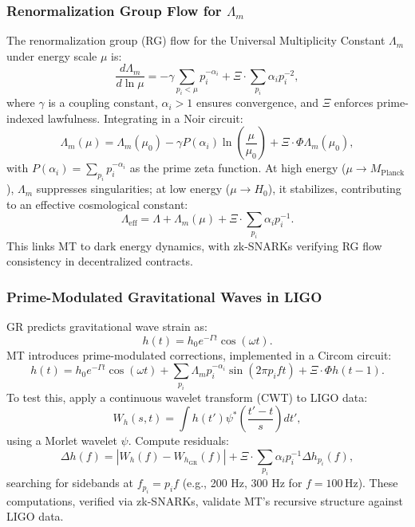 \documentclass{article}
\theoremstyle{plain}
\begin{document}
\subsubsection{Renormalization Group Flow for \(\Lambda_m\)}
The renormalization group (RG) flow for the Universal Multiplicity Constant \(\Lambda_m\) under energy scale \(\mu\) is:
\begin{equation}
\frac{d \Lambda_m}{d \ln \mu} = -\gamma \sum_{p_i < \mu} p_i^{-\alpha_i} + \Xi \cdot \sum_{p_i} \alpha_i p_i^{-2},
\end{equation}
where \(\gamma\) is a coupling constant, \(\alpha_i > 1\) ensures convergence, and \(\Xi\) enforces prime-indexed lawfulness. Integrating in a Noir circuit:
\begin{equation}
\Lambda_m(\mu) = \Lambda_m(\mu_0) - \gamma P(\alpha_i) \ln \left( \frac{\mu}{\mu_0} \right) + \Xi \cdot \Phi \Lambda_m(\mu_0),
\end{equation}
with \( P(\alpha_i) = \sum_{p_i} p_i^{-\alpha_i} \) as the prime zeta function. At high energy (\(\mu \to M_{\text{Planck}}\)), \(\Lambda_m\) suppresses singularities; at low energy (\(\mu \to H_0\)), it stabilizes, contributing to an effective cosmological constant:
\begin{equation}
\Lambda_{\text{eff}} = \Lambda + \Lambda_m(\mu) + \Xi \cdot \sum_{p_i} \alpha_i p_i^{-1}.
\end{equation}
This links MT to dark energy dynamics, with zk-SNARKs verifying RG flow consistency in decentralized contracts.

\subsubsection{Prime-Modulated Gravitational Waves in LIGO}
GR predicts gravitational wave strain as:
\begin{equation}
h(t) = h_0 e^{-\Gamma t} \cos(\omega t).
\end{equation}
MT introduces prime-modulated corrections, implemented in a Circom circuit:
\begin{equation}
h(t) = h_0 e^{-\Gamma t} \cos(\omega t) + \sum_{p_i} \Lambda_m p_i^{-\alpha_i} \sin(2 \pi p_i f t) + \Xi \cdot \Phi h(t-1).
\end{equation}
To test this, apply a continuous wavelet transform (CWT) to LIGO data:
\begin{equation}
W_h(s, t) = \int h(t') \psi^*\left( \frac{t' - t}{s} \right) dt',
\end{equation}
using a Morlet wavelet \(\psi\). Compute residuals:
\begin{equation}
\Delta h(f) = |W_h(f) - W_{h_{\text{GR}}}(f)| + \Xi \cdot \sum_{p_i} \alpha_i p_i^{-1} \Delta h_{p_i}(f),
\end{equation}
searching for sidebands at \( f_{p_i} = p_i f \) (e.g., 200 Hz, 300 Hz for \( f = 100 \, \text{Hz} \)). These computations, verified via zk-SNARKs, validate MT’s recursive structure against LIGO data.
\end{document}
